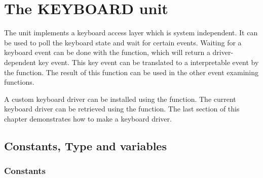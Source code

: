 %
%
%
%
%
%
\chapter{The KEYBOARD unit}

The  unit implements a keyboard access layer which is system
independent. It can be used to poll the keyboard state and wait for certain
events. Waiting for a keyboard event can be done with the 
function, which will return a driver-dependent key event. This key event can
be translated to a interpretable event by the 
function. The result of this function can be used in the other event
examining functions.

A custom keyboard driver can be installed using the 
function. The current keyboard driver can be retrieved using the
 function. The last section of this chapter
demonstrates how to make a keyboard driver.

\section{Constants, Type and variables }

\subsection{Constants}

